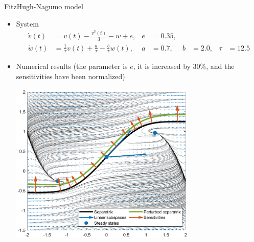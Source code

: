 \begin{frame}{FitzHugh-Nagumo model}
	\begin{itemize}
		\item System
		\begin{subequations}
			\begin{align}
				\dot v(t) &= v(t) - \frac{v^3(t)}{3} - w + e, &
				e &= 0.35, \\
				\dot w(t) &= \frac{1}{\tau} v(t) + \frac{a}{\tau} - \frac{b}{\tau} w(t), &
				a    &=  0.7, &
				b    &=  2.0, &
				\tau &= 12.5
			\end{align}
		\end{subequations}
		\item Numerical results (the parameter is $e$, it is increased by 30\%, and the sensitivities have been normalized)
		\vspace{-2pt}
		\begin{center}
			\includegraphics[width=0.7\textwidth, trim=0 0 0 20pt, clip]{./fig/fitzhughnagumo}
		\end{center}
	\end{itemize}
\end{frame}
